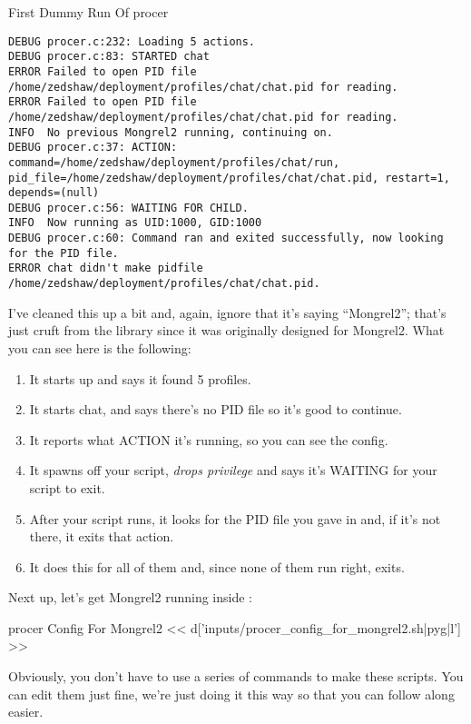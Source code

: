 \begin{code}{First Dummy Run Of procer}
\begin{lstlisting}
DEBUG procer.c:232: Loading 5 actions.
DEBUG procer.c:83: STARTED chat
ERROR Failed to open PID file /home/zedshaw/deployment/profiles/chat/chat.pid for reading.
ERROR Failed to open PID file /home/zedshaw/deployment/profiles/chat/chat.pid for reading.
INFO  No previous Mongrel2 running, continuing on.
DEBUG procer.c:37: ACTION: command=/home/zedshaw/deployment/profiles/chat/run, pid_file=/home/zedshaw/deployment/profiles/chat/chat.pid, restart=1, depends=(null)
DEBUG procer.c:56: WAITING FOR CHILD.
INFO  Now running as UID:1000, GID:1000
DEBUG procer.c:60: Command ran and exited successfully, now looking for the PID file.
ERROR chat didn't make pidfile /home/zedshaw/deployment/profiles/chat/chat.pid.
\end{lstlisting}
\end{code}

I've cleaned this up a bit and, again, ignore that it's saying ``Mongrel2'';
that's just cruft from the library since it was originally designed
for Mongrel2.  What you can see here is the following:

\begin{enumerate}
\item It starts up and says it found 5 profiles.
\item It starts chat, and says there's no PID file so it's good to continue.
\item It reports what ACTION it's running, so you can see the config.
\item It spawns off your  script, \emph{drops privilege}
     and says it's WAITING for your script to exit.
\item After your script runs, it looks for the PID file you gave in  and, if it's not there, it exits that action.
\item It does this for all of them and, since none of them run right,  exits.
\end{enumerate}

Next up, let's get Mongrel2 running inside :

\begin{code}{procer Config For Mongrel2}
<< d['inputs/procer_config_for_mongrel2.sh|pyg|l'] >>
\end{code}

Obviously, you don't have to use a series of  commands to
make these scripts.  You can edit them just fine, we're just doing it
this way so that you can follow along easier.

